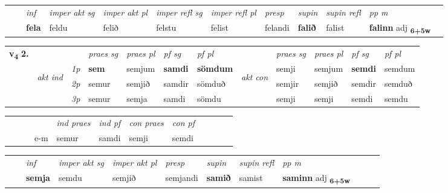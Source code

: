 \begin{tabular}{llllllllllll}
 & & \textit{inf} & \textit{imper akt sg} & \textit{imper akt pl} & \textit{imper refl sg} & \textit{imper refl pl} & \textit{presp} & \textit{supin} & \textit{supin refl} & \textit{pp m}     \\*
  & & \textbf{fela} & feldu  & felið & felstu & felist & felandi &  \textbf{falið} & falist & \textbf{falinn} adj \textbf{\textsubscript{6+5w}} \\*
\cmidrule{1-12}
\end{tabular}



\begin{tabular}{llllllllllll} \toprule
\multirow{4}{*}{{{\textbf{v{\textsubscript{4}}} \Large{\textbf{2.}}}}}  & &   &  \textit{praes sg}  & \textit{praes pl}  &\textit{ pf sg} & \textit{pf pl} &  &  \textit{praes sg}  & \textit{praes pl}  & \textit{pf sg} & \textit{pf pl } \\*
	\cmidrule{4-7} \cmidrule{9-12}
 & \multirow{3}{*}{\begin{turn}{90}\textit{akt ind}\end{turn}} & {\textit{1p}} & \textbf{sem} & semjum    & \textbf{samdi} & \textbf{sömdum} & \multirow{3}{*}{\begin{turn}{90}\textit{akt con}\end{turn}} &semji & semjum & \textbf{semdi} & semdum\\*
& &  {\textit{2p}} &  semur  & semjið   & samdir & sömduð & & semjir & semjið & semdir & semduð \\*
& &  {\textit{3p}} & semur & semja   & samdi & sömdu & & semji & semji& semdi & semdu  \\*
\cmidrule{4-7} \cmidrule{9-12}
\end{tabular}


\begin{tabular}{llllllllllll}
 & &  & &  \textit{ind praes} & \textit{ind pf} & \textit{con praes} & \textit{con pf} \\*
&  & & e-m & semur & samdi & semji & semdi \\*
\cmidrule{5-9}
\end{tabular}


\begin{tabular}{llllllllllll}
 & & \textit{inf} & \textit{imper akt sg} & \textit{imper akt pl}   & \textit{presp} & \textit{supin} & \textit{supin refl} & \textit{pp m}     \\*
  & & \textbf{semja} & semdu  & semjið   & semjandi &  \textbf{samið} & samist & \textbf{saminn} adj \textbf{\textsubscript{6+5w}} \\*
\cmidrule{1-12}
\end{tabular}



